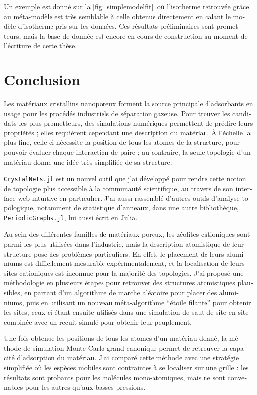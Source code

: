 \documentclass[thesis]{subfiles}
\begin{document}
\begin{otherlanguage}{french}
Un exemple est donné sur la \cref{fig_simplemodelfit}, où l'isotherme retrouvée grâce au méta-modèle est très semblable à celle obtenue directement en calant le modèle d'isotherme pris sur les données. Ces résultats préliminaires sont prometteurs, mais la base de donnée est encore en cours de construction au moment de l'écriture de cette thèse.

\section*{Conclusion}

Les matériaux cristallins nanoporeux forment la source principale d'adsorbants en usage pour les procédés industriels de séparation gazeuse. Pour trouver les candidats les plus prometteurs, des simulations numériques permettent de prédire leurs propriétés ; elles requièrent cependant une description du matériau. À l'échelle la plus fine, celle-ci nécessite la position de tous les atomes de la structure, pour pouvoir évaluer chaque interaction de paire ; au contraire, la seule topologie d'un matériau donne une idée très simplifiée de sa structure.

\texttt{CrystalNets.jl} est un nouvel outil que j'ai développé pour rendre cette notion de topologie plus accessible à la communauté scientifique, au travers de son interface web intuitive en particulier. J'ai aussi rassemblé d'autres outils d'analyse topologique, notamment de statistique d'anneaux, dans une autre bibliothèque, \texttt{PeriodicGraphs.jl}, lui aussi écrit en Julia.

Au sein des différentes familles de matériaux poreux, les zéolites cationiques sont parmi les plus utilisées dans l'industrie, mais la description atomistique de leur structure pose des problèmes particuliers. En effet, le placement de leurs aluminiums est difficilement mesurable expérimentalement, et la localisation de leurs sites cationiques est inconnue pour la majorité des topologies. J'ai proposé une méthodologie en plusieurs étapes pour retrouver des structures atomistiques plausibles, en partant d'un algorithme de marche aléatoire pour placer des aluminiums, puis en utilisant un nouveau méta-algorithme ``étoile filante'' pour obtenir les sites, ceux-ci étant ensuite utilisés dans une simulation de saut de site en site combinée avec un recuit simulé pour obtenir leur peuplement.

Une fois obtenue les positions de tous les atomes d'un matériau donné, la méthode de simulation Monte-Carlo grand canonique permet de retrouver la capacité d'adsorption du matériau. J'ai comparé cette méthode avec une stratégie simplifiée où les espèces mobiles sont contraintes à se localiser sur une grille : les résultats sont probants pour les molécules mono-atomiques, mais ne sont convenables pour les autres qu'aux basses pressions.


\end{otherlanguage}
\end{document}
